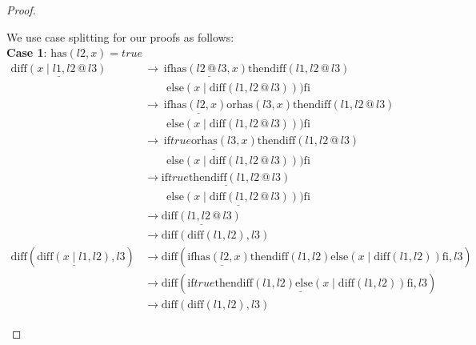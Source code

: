 \documentclass[12pt, a4paper]{article}
\newcommand{\rel}[1]{\mathrel{#1}}
\newcommand{\rmx}[1]{\mathrm{#1}}
\newcommand{\larrow}{\longrightarrow}
\newcommand{\under}{\underline}
\begin{document}
\begin{proof}
\begin{description}
We use case splitting for our proofs as follows: \\
\textbf{Case 1}: $\rmx{has}(l2, x) = true$
\begin{align*}
\under{\rmx{diff}(x \rel{|} l1, l2 \rel{@} l3)}
	&\larrow\ \rel{\rmx{if}} \under{\rmx{has}(l2 \rel{@} l3, x)} \rel{\rmx{then}} \rmx{diff}(l1,l2 \rel{@} l3) \\
	&\quad \quad \rel{\rmx{else}} (x \rel{|} \rmx{diff}(l1, l2 \rel{@} l3))) \rel{\rmx{fi}} \tag{by } \\
	&\larrow\ \rel{\rmx{if}} \under{\rmx{has}(l2, x)} \rel{\rmx{or}} \rmx{has}(l3, x) \rel{\rmx{then}} \rmx{diff}(l1,l2 \rel{@} l3) \\
	&\quad \quad \rel{\rmx{else}} (x \rel{|} \rmx{diff}(l1, l2 \rel{@} l3))) \rel{\rmx{fi}} \tag{by Lemma 1 from Problem 6} \\
	&\larrow\ \rel{\rmx{if}} \under{true \rel{\rmx{or}} \rmx{has}(l3, x)} \rel{\rmx{then}} \rmx{diff}(l1,l2 \rel{@} l3) \\
	&\quad \quad \rel{\rmx{else}} (x \rel{|} \rmx{diff}(l1, l2 \rel{@} l3))) \rel{\rmx{fi}} \tag{by case splitting} \\
	&\larrow \under{\rel{\rmx{if}} true \rel{\rmx{then}} \rmx{diff}(l1,l2 \rel{@} l3)} \\
	&\quad \quad \under{\rel{\rmx{else}} (x \rel{|} \rmx{diff}(l1, l2 \rel{@} l3))) \rel{\rmx{fi}}} \tag{by or} \\
	&\larrow \under{\rmx{diff}(l1,l2 \rel{@} l3)} \tag{by if1} \\
	&\larrow \rmx{diff}(\rmx{diff}(l1,l2), l3) \tag{by IH} \\
\rmx{diff}(\under{\rmx{diff}(x \rel{|} l1, l2)}, l3)
	&\larrow \rmx{diff}(\rel{\rmx{if}} \under{\rmx{has}(l2, x)} \rel{\rmx{then}} \rmx{diff}(l1, l2) \rel{\rmx{else}} (x \rel{|} \rmx{diff}(l1, l2)) \rel{\rmx{fi}}, l3) \tag{by diff2} \\
	&\larrow \rmx{diff}(\under{\rel{\rmx{if}} true \rel{\rmx{then}} \rmx{diff}(l1, l2) \rel{\rmx{else}} (x \rel{|} \rmx{diff}(l1, l2)) \rel{\rmx{fi}}}, l3) \tag{by case splitting} \\
	&\larrow \rmx{diff}(\rmx{diff}(l1, l2), l3) \tag{by if1}
\end{align*}


\end{description}
\end{proof}
\end{document}

